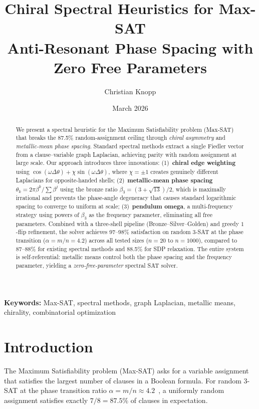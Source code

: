 \documentclass[11pt,a4paper]{article}
\title{\textbf{Chiral Spectral Heuristics for Max-SAT}\\[6pt]
\large Anti-Resonant Phase Spacing with Zero Free Parameters}
\author[1]{Christian Knopp}
\affil[1]{Zynerji Research}
\date{March 2026}
\begin{document}
\maketitle

\begin{abstract}
We present a spectral heuristic for the Maximum Satisfiability problem
(Max-SAT) that breaks the 87.5\% random-assignment ceiling through
\emph{chiral asymmetry} and \emph{metallic-mean phase spacing}.
Standard spectral methods extract a single Fiedler vector from a
clause--variable graph Laplacian, achieving parity with random assignment
at large scale. Our approach introduces three innovations:
(1)~\textbf{chiral edge weighting} using $\cos(\omega\Delta\theta) +
\chi\sin(\omega\Delta\theta)$, where $\chi=\pm1$ creates genuinely
different Laplacians for opposite-handed shells;
(2)~\textbf{metallic-mean phase spacing} $\theta_k = 2\pi\beta^k /
\sum\beta^j$ using the bronze ratio $\beta_3 = (3+\sqrt{13})/2$, which
is maximally irrational and prevents the phase-angle degeneracy that
causes standard logarithmic spacing to converge to uniform at scale;
(3)~\textbf{pendulum omega}, a multi-frequency strategy using powers of
$\beta_3$ as the frequency parameter, eliminating all free parameters.
Combined with a three-shell pipeline (Bronze--Silver--Golden) and
greedy $1$-flip refinement, the solver achieves 97--98\% satisfaction
on random 3-SAT at the phase transition ($\alpha = m/n = 4.2$) across
all tested sizes ($n = 20$ to $n = 1000$), compared to 87--88\% for
existing spectral methods and 88.5\% for SDP relaxation.
The entire system is self-referential: metallic means control both
the phase spacing and the frequency parameter, yielding a
\emph{zero-free-parameter} spectral SAT solver.
\end{abstract}

\noindent\textbf{Keywords:} Max-SAT, spectral methods, graph Laplacian,
metallic means, chirality, combinatorial optimization

\section{Introduction}

The Maximum Satisfiability problem (Max-SAT) asks for a variable
assignment that satisfies the largest number of clauses in a Boolean
formula. For random 3-SAT at the phase transition ratio
$\alpha = m/n \approx 4.2$~\cite{mezard2009information}, a uniformly
random assignment satisfies exactly $7/8 = 87.5\%$ of clauses in
expectation.
\end{document}
